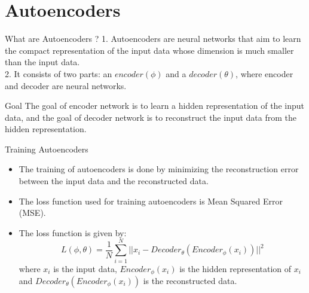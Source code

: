 \section*{Autoencoders}
\begin{frame}{What are Autoencoders ?}
1. Autoencoders are neural networks that aim to learn the compact representation of the input data whose dimension is much smaller than the input data.\\
2. It consists of two parts: an $encoder(\phi)$ and a $decoder(\theta)$, where encoder and decoder are neural networks.\\

\pause

\begin{block}{Goal}
    The goal of encoder network is to learn a hidden representation of the input data, and the goal of decoder network is to reconstruct the input data from the hidden representation.
\end{block}
\end{frame}

\begin{frame}{Training Autoencoders}
    \begin{itemize}
        \item The training of autoencoders is done by minimizing the reconstruction error between the input data and the reconstructed data.
        \item The loss function used for training autoencoders is Mean Squared Error (MSE).
        \pause
        \item The loss function is given by:
        \begin{equation}
            \boxed{L(\phi, \theta) = \frac{1}{N} \sum_{i=1}^{N} ||x_i - Decoder_{\theta}(Encoder_{\phi}(x_i))||^2}
        \end{equation}
        where $x_i$ is the input data, $Encoder_{\phi}(x_i)$ is the hidden representation of $x_i$ and $Decoder_{\theta}(Encoder_{\phi}(x_i))$ is the reconstructed data.
    \end{itemize}
    
\end{frame}

